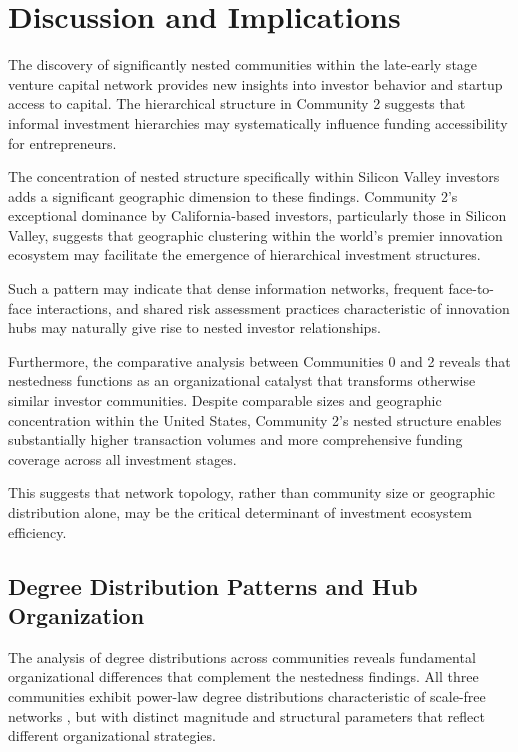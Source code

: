 
\section{Discussion and Implications}

The discovery of significantly nested communities within the late-early stage venture capital network provides new insights into investor behavior and startup access to capital. The hierarchical structure in Community 2 suggests that informal investment hierarchies may systematically influence funding accessibility for entrepreneurs.

The concentration of nested structure specifically within Silicon Valley investors adds a significant geographic dimension to these findings. Community 2's exceptional dominance by California-based investors, particularly those in Silicon Valley, suggests that geographic clustering within the world's premier innovation ecosystem may facilitate the emergence of hierarchical investment structures. 

Such a pattern may indicate that dense information networks, frequent face-to-face interactions, and shared risk assessment practices characteristic of innovation hubs may naturally give rise to nested investor relationships.

Furthermore, the comparative analysis between Communities 0 and 2 reveals that nestedness functions as an organizational catalyst that transforms otherwise similar investor communities. Despite comparable sizes and geographic concentration within the United States, Community 2's nested structure enables substantially higher transaction volumes and more comprehensive funding coverage across all investment stages. 

This suggests that network topology, rather than community size or geographic distribution alone, may be the critical determinant of investment ecosystem efficiency.

\subsection{Degree Distribution Patterns and Hub Organization}

The analysis of degree distributions across communities reveals fundamental organizational differences that complement the nestedness findings. All three communities exhibit power-law degree distributions characteristic of scale-free networks \cite{Borgatti2011}, but with distinct magnitude and structural parameters that reflect different organizational strategies.

